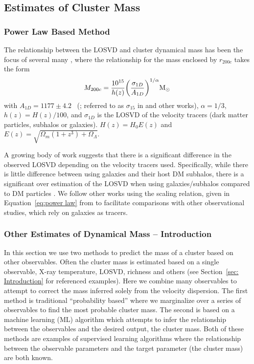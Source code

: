 \documentclass[fleqn,usenatbib]{mnras}
\begin{document}
\subsection{Estimates of Cluster Mass}\label{sec: mass}
\subsubsection{Power Law Based Method}
The relationship between the LOSVD and cluster dynamical mass has been the focus of several many , where the relationship for the mass enclosed by $r_{200c}$ takes the form
\begin{equation}\label{eq:power law}
	M_{200c} = \frac{10^{15}}{h(z)} \bigg{(}\frac{\sigma_{1D}}{A_{1D}} \bigg{)}^{1/\alpha} \hbox{$\mathrm{M}_\odot$}
\end{equation}
with $A_{1D} = 1177 \pm 4.2$ \kms\ (\citealt{Munari2013}; referred to as $\sigma_{15}$ in \citealt{Evrard2008} and other works), $\alpha = 1/3$, $h(z) = H(z)/100$, and $\sigma_{1D}$ is the LOSVD of the velocity tracers (dark matter particles, subhalos or galaxies). $H(z) = H_0 E(z)$ and $E(z) = \sqrt{\Omega_m(1+z^3)+\Omega_{\Lambda}}$.

A growing body of work suggests that there is a significant difference in the observed LOSVD depending on the velocity tracers used. Specifically, while there is little difference between using galaxies and their host DM subhalos, there is a significant over estimation of the LOSVD when using galaxies/subhalos compared to DM particles \citep{Munari2013}. We follow other works  using the scaling relation, given in Equation~\ref{eq:power law} from \cite{Munari2013} to facilitate comparisons with other observational studies, which rely on galaxies as tracers. 

\subsubsection{Other Estimates of Dynamical Mass -- Introduction}
In this section we use two methods to predict the mass of a cluster based on other observables. Often the cluster mass is estimated based on a single observable, X-ray temperature, LOSVD, richness and others (see Section~\ref{sec: Introduction} for referenced examples). Here we combine many observables to attempt to correct the mass inferred solely from the velocity dispersion. The first method is traditional ``probability based'' where we marginalize over a series of observables to find the most probable cluster mass. The second is based on a machine learning (ML) algorithm which attempts to infer the relationship between the observables and the desired output, the cluster mass. Both of these methods are examples of supervised learning algorithms where the relationship between the observable parameters and the target parameter (the cluster mass) are both known.
\end{document}
